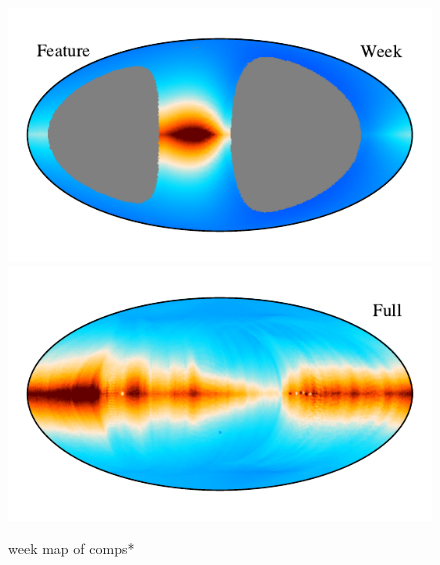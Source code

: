 \documentclass{aa}
\begin{document}
\begin{figure}
    \vspace{-0.6cm}

    \includegraphics[width=0.9\columnwidth]{figs/zodi_comps/zodi_06_feature_week.pdf}\includegraphics[width=0.9\columnwidth]{figs/zodi_comps/zodi_06_feature_full.pdf}

    \caption{week map of comps*}
    \label{fig: comp week}
  \end{figure}
\end{document}
